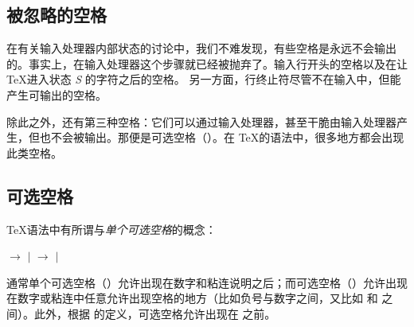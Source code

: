 \documentclass{book}
\begin{document}
\subsection{被忽略的空格}

在有关输入处理器内部状态的讨论中，我们不难发现，有些空格是永远不会输出的。事实上，在输入处理器这个步骤就已经被抛弃了。输入行开头的空格以及在让 \TeX 进入状态 {\itshape S} 的字符之后的空格。
%
另一方面，行终止符尽管不在输入中，但能产生可输出的空格。

除此之外，还有第三种空格：它们可以通过输入处理器，甚至干脆由输入处理器产生，但也不会被输出。那便是可选空格（）。在 \TeX 的语法中，很多地方都会出现此类空格。

\subsection{可选空格}

\TeX 语法中有所谓与\emph{单个可选空格}的概念：
\begin{disp} $\longrightarrow$
 $|$ \nl
{} $\longrightarrow$
 $|$ \end{disp}
通常单个可选空格（）允许出现在数字和粘连说明之后；而可选空格（）允许出现在数字或粘连中任意允许出现空格的地方（比如负号与数字之间，又比如  和  之间）。此外，根据  的定义，可选空格允许出现在 \n{=} 之前。
\end{document}
